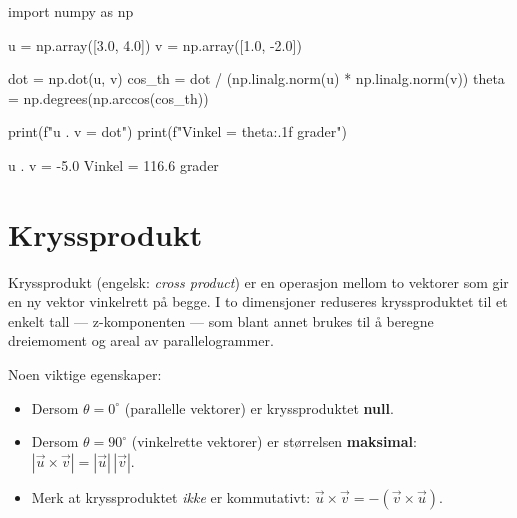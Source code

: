 \begin{pythonkode}
import numpy as np

u = np.array([3.0,  4.0])
v = np.array([1.0, -2.0])

dot    = np.dot(u, v)
cos_th = dot / (np.linalg.norm(u) * np.linalg.norm(v))
theta  = np.degrees(np.arccos(cos_th))

print(f"u . v  = {dot}")
print(f"Vinkel = {theta:.1f} grader")
\end{pythonkode}
\begin{pythonoutput}
u . v  = -5.0
Vinkel = 116.6 grader
\end{pythonoutput}


\section{Kryssprodukt}

Kryssprodukt (engelsk: \textit{cross product}) er en operasjon mellom to vektorer som gir en ny vektor vinkelrett på begge. I to dimensjoner reduseres kryssproduktet til et enkelt tall — z-komponenten — som blant annet brukes til å beregne dreiemoment og areal av parallelogrammer.


Noen viktige egenskaper:
\begin{itemize}
    \item Dersom $\theta = 0^\circ$ (parallelle vektorer) er kryssproduktet \textbf{null}.
    \item Dersom $\theta = 90^\circ$ (vinkelrette vektorer) er størrelsen \textbf{maksimal}: $|\vec{u}\times\vec{v}|=|\vec{u}|\,|\vec{v}|$.
    \item Merk at kryssproduktet \emph{ikke} er kommutativt: $\vec{u}\times\vec{v} = -(\vec{v}\times\vec{u})$.
\end{itemize}

